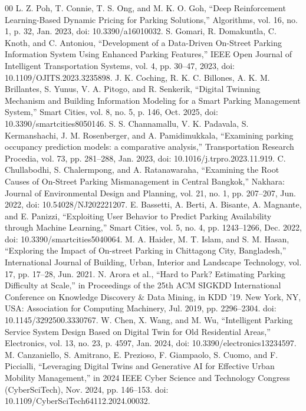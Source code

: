 \documentclass[conference]{IEEEtran}
\begin{document}
\begin{thebibliography}{00}
 L. Z. Poh, T. Connie, T. S. Ong, and M. K. O. Goh, “Deep Reinforcement Learning-Based Dynamic Pricing for Parking Solutions,” Algorithms, vol. 16, no. 1, p. 32, Jan. 2023, doi: 10.3390/a16010032.
 S. Gomari, R. Domakuntla, C. Knoth, and C. Antoniou, “Development of a Data-Driven On-Street Parking Information System Using Enhanced Parking Features,” IEEE Open Journal of Intelligent Transportation Systems, vol. 4, pp. 30–47, 2023, doi: 10.1109/OJITS.2023.3235898.
 J. K. Coching, R. K. C. Billones, A. K. M. Brillantes, S. Yunus, V. A. Pitogo, and R. Senkerik, “Digital Twinning Mechanism and Building Information Modeling for a Smart Parking Management System,” Smart Cities, vol. 8, no. 5, p. 146, Oct. 2025, doi: 10.3390/smartcities8050146.
 S. S. Channamallu, V. K. Padavala, S. Kermanshachi, J. M. Rosenberger, and A. Pamidimukkala, “Examining parking occupancy prediction models: a comparative analysis,” Transportation Research Procedia, vol. 73, pp. 281–288, Jan. 2023, doi: 10.1016/j.trpro.2023.11.919.
 C. Chullabodhi, S. Chalermpong, and A. Ratanawaraha, “Examining the Root Causes of On-Street Parking Mismanagement in Central Bangkok,” Nakhara: Journal of Environmental Design and Planning, vol. 21, no. 1, pp. 207–207, Jun. 2022, doi: 10.54028/NJ202221207.
 E. Bassetti, A. Berti, A. Bisante, A. Magnante, and E. Panizzi, “Exploiting User Behavior to Predict Parking Availability through Machine Learning,” Smart Cities, vol. 5, no. 4, pp. 1243–1266, Dec. 2022, doi: 10.3390/smartcities5040064.
 M. A. Haider, M. T. Islam, and S. M. Hasan, “Exploring the Impact of On-street Parking in Chittagong City, Bangladesh,” International Journal of Building, Urban, Interior and Landscape Technology, vol. 17, pp. 17–28, Jun. 2021.
 N. Arora et al., “Hard to Park? Estimating Parking Difficulty at Scale,” in Proceedings of the 25th ACM SIGKDD International Conference on Knowledge Discovery \& Data Mining, in KDD ’19. New York, NY, USA: Association for Computing Machinery, Jul. 2019, pp. 2296–2304. doi: 10.1145/3292500.3330767.
 W. Chen, X. Wang, and M. Wu, “Intelligent Parking Service System Design Based on Digital Twin for Old Residential Areas,” Electronics, vol. 13, no. 23, p. 4597, Jan. 2024, doi: 10.3390/electronics13234597.
 M. Canzaniello, S. Amitrano, E. Prezioso, F. Giampaolo, S. Cuomo, and F. Piccialli, “Leveraging Digital Twins and Generative AI for Effective Urban Mobility Management,” in 2024 IEEE Cyber Science and Technology Congress (CyberSciTech), Nov. 2024, pp. 146–153. doi: 10.1109/CyberSciTech64112.2024.00032.

\end{thebibliography}
\end{document}
